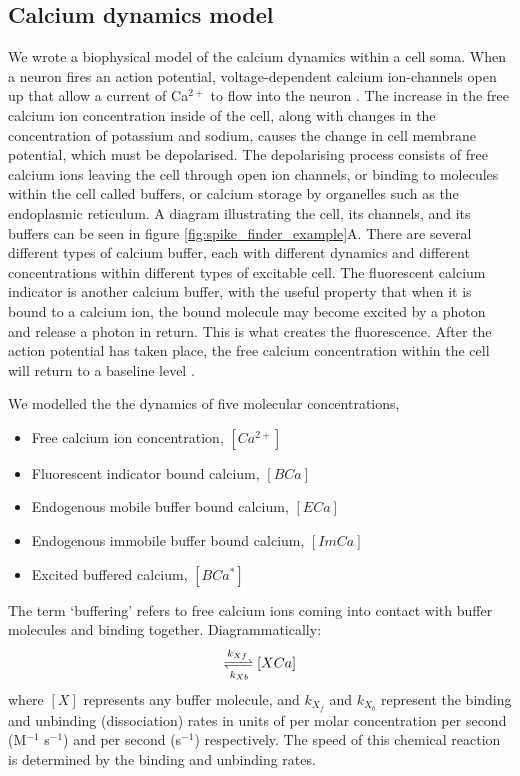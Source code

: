 \documentclass[a4paper,12pt]{article}
\theoremstyle{definition}
\begin{document}
\subsection{Calcium dynamics model}
We wrote a biophysical model of the calcium dynamics within a cell soma. When a neuron fires an action potential, voltage-dependent calcium ion-channels open up that allow a current of Ca$^{2+}$ to flow into the neuron \cite{koch}. The increase in the free calcium ion concentration inside of the cell, along with changes in the concentration of potassium and sodium, causes the change in cell membrane potential, which must be depolarised. The depolarising process consists of free calcium ions leaving the cell through open ion channels, or binding to molecules within the cell called buffers, or calcium storage by organelles such as the endoplasmic reticulum. A diagram illustrating the cell, its channels, and its buffers can be seen in figure \ref{fig:spike_finder_example}A. There are several different types of calcium buffer, each with different dynamics and different concentrations within different types of excitable cell. The fluorescent calcium indicator is another calcium buffer, with the useful property that when it is bound to a calcium ion, the bound molecule may become excited by a photon and release a photon in return. This is what creates the fluorescence. After the action potential has taken place, the free calcium concentration within the cell will return to a baseline level \cite{maravall}.

We modelled the the dynamics of five molecular concentrations,
\begin{itemize}
    \item Free calcium ion concentration, $[Ca^{2+}]$
    \item Fluorescent indicator bound calcium, $[BCa]$
    \item Endogenous mobile buffer bound calcium, $[ECa]$
    \item Endogenous immobile buffer bound calcium, $[ImCa]$
    \item Excited buffered calcium, $[BCa^{\ast}]$
\end{itemize}
The term ‘buffering’ refers to free calcium ions coming into contact with buffer molecules and binding together. Diagrammatically:
\begin{align*}
    [X][Ca^{2+}] \xrightleftharpoons[k_{Xb}]{k_{Xf}} [XCa]
\end{align*}
where $[X]$ represents any buffer molecule, and $k_{X_f}$ and $k_{X_b}$ represent the binding and unbinding (dissociation) rates in units of per molar concentration per second (M$^{−1}$ s$^{−1}$) and per second (s$^{−1}$) respectively. The speed of this chemical reaction is determined by the binding and unbinding rates.
\end{document}
